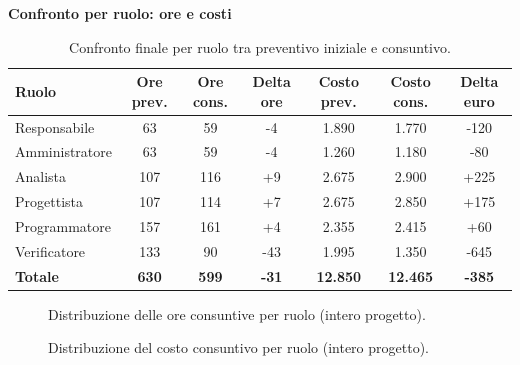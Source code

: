 \documentclass[a4paper, 11pt, oneside]{scrartcl} %
\begin{document}
\begin{table}[!ht]
\centering
{\large \textbf{Confronto per ruolo: ore e costi}} \\
\vspace{0.3cm}
\renewcommand{\arraystretch}{1.3}
\begin{tabular}{|l|c|c|c|c|c|c|}
\hline
\textbf{Ruolo} & \textbf{Ore prev.} & \textbf{Ore cons.} & \textbf{Delta ore} & \textbf{Costo prev.} & \textbf{Costo cons.} & \textbf{Delta euro} \\
\hline
Responsabile & 63 & 59 & -4 & 1.890 & 1.770 & -120 \\
Amministratore & 63 & 59 & -4 & 1.260 & 1.180 & -80 \\
Analista & 107 & 116 & +9 & 2.675 & 2.900 & +225 \\
Progettista & 107 & 114 & +7 & 2.675 & 2.850 & +175 \\
Programmatore & 157 & 161 & +4 & 2.355 & 2.415 & +60 \\
Verificatore & 133 & 90 & -43 & 1.995 & 1.350 & -645 \\
\hline
\rowcolor{blue!10}
\textbf{Totale} & \textbf{630} & \textbf{599} & \textbf{-31} & \textbf{12.850} & \textbf{12.465} & \textbf{-385} \\
\hline
\end{tabular}
\caption{Confronto finale per ruolo tra preventivo iniziale e consuntivo.}
\label{tab:ore_ruolo_consuntivo_finale}
\end{table}
\FloatBarrier

\begin{figure}[!ht]
\centering
{}
\caption{Distribuzione delle ore consuntive per ruolo (intero progetto).}
\label{fig:pie_ore_ruolo_finale}
\end{figure}

\begin{figure}[!ht]
\centering
{}
\caption{Distribuzione del costo consuntivo per ruolo (intero progetto).}
\label{fig:pie_costi_ruolo_finale}
\end{figure}
\FloatBarrier
\end{document}
